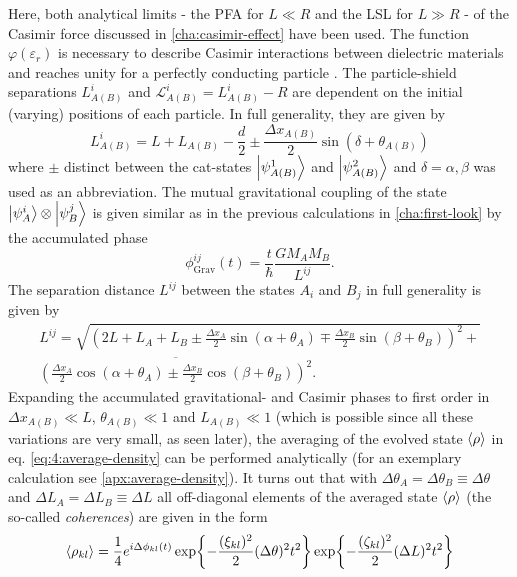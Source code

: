 Here, both analytical limits - the PFA for $L \ll R$ and the LSL for $L \gg R$ - of the Casimir force discussed in \cref{cha:casimir-effect} have been used.
The function $\varphi(\varepsilon_r)$ is necessary to describe Casimir interactions between dielectric materials and reaches unity for a perfectly conducting particle \cite{Lifshitz_1956}.
The particle-shield separations $L^i_{A(B)}$ and $\mathscr{L}^i_{A(B)} = L^i_{A(B)}-R$ are dependent on the initial (varying) positions of each particle.
In full generality, they are given by
\begin{equation}\label{eq:4:L-casimir}
  L^i_{A(B)} = L + L_{A(B)} - \frac{d}{2} \pm \frac{\Delta x_{A(B)}}{2} \sin(\delta + \theta_{A(B)})
\end{equation}
where $\pm$ distinct between the cat-states $\ket{\psi^1_{A(B)}}$ and $\ket{\psi^2_{A(B)}}$ and $\delta = \alpha, \beta$ was used as an abbreviation.
The mutual gravitational coupling of the state $\ket{\psi^i_A}\otimes\ket{\psi^j_B}$ is given similar as in the previous calculations in \cref{cha:first-look} by the accumulated phase
\begin{equation}\label{eq:4:phi-grav}
  \phi^{ij}_\mathrm{Grav}(t) = \frac{t}{\hbar} \frac{G M_A M_B}{L^{ij}} .
\end{equation}
The separation distance $L^{ij}$ between the states $A_i$ and $B_j$ in full generality is given by
\begin{multline}\label{eq:4:L-gravity}
  L^{ij} = \sqrt{\left(2L + L_A + L_B \pm \frac{\Delta x_A}{2}\sin(\alpha + \theta_A) \mp \frac{\Delta x_B}{2}\sin(\beta + \theta_B)\right)^2 +} \\ \overline{\left(\frac{\Delta x_A}{2}\cos(\alpha + \theta_A) \pm \frac{\Delta x_B}{2}\cos(\beta + \theta_B)\right)^2} .
\end{multline}
Expanding the accumulated gravitational- and Casimir phases to first order in $\Delta x_{A(B)} \ll L$, $\theta_{A(B)} \ll 1$ and $L_{A(B)} \ll 1$ (which is possible since all these variations are very small, as seen later), the averaging of the evolved state $\left\langle\rho\right\rangle$ in eq. \eqref{eq:4:average-density} can be performed analytically (for an exemplary calculation see \cref{apx:average-density}).
It turns out that with $\Delta \theta_A = \Delta \theta_B \equiv \Delta\theta$ and $\Delta L_A = \Delta L_B \equiv \Delta L$ all off-diagonal elements of the averaged state $\left\langle\rho\right\rangle$ (the so-called \emph{coherences}) are given in the form
\begin{equation}\label{eq:4:average-density-element}
  \left\langle\rho_{kl}\right\rangle = \frac{1}{4} e^{i \Delta \phi_{kl}(t)} \exp{-\frac{(\xi_{kl})^2}{2} (\Delta\theta)^2 t^2} \exp{-\frac{(\zeta_{kl})^2}{2} (\Delta L)^2 t^2}
\end{equation}
